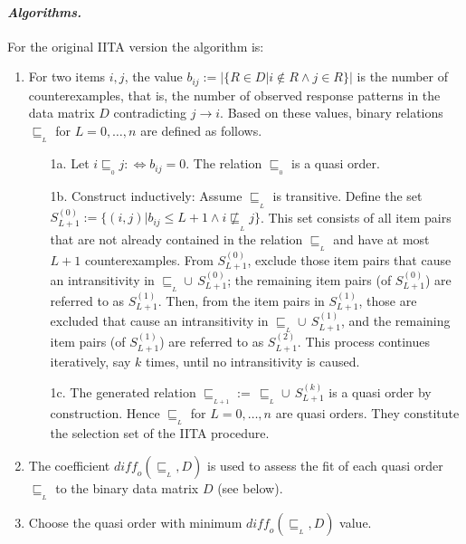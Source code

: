 \documentclass[nojss]{jss}
\begin{document}
\paragraph{\it Algorithms.}
For the original IITA version \citep{Schrepp:03} the algorithm is: 
\begin{enumerate}
\item 
For two items $i, j$, the value $b_{ij} := |\{R \in D| i\not\in R \wedge j\in R\}|$ is the number of counterexamples, that is, the number of observed response patterns in the data matrix $D$ contradicting $j \rightarrow i$. Based on these values, binary relations $\sqsubseteq_{_L}$ for 
$L = 0, \ldots, n$ are defined as follows.
\begin{enumerate} 
\item[1a.] 
Let $i \sqsubseteq_{_0} j : \Leftrightarrow b_{ij} = 0$. The relation $\sqsubseteq_{_0}$ is  a quasi order. 
\item[1b.] 
Construct inductively:
Assume $\sqsubseteq_{_L}$ is transitive. Define the set $S_{L+1}^{(0)}:=\{(i,j)| b_{ij} \leq L +1 
\wedge i \not\sqsubseteq_{_L} \!j \}$. 
This set consists of all item pairs that are not already contained in the relation $\sqsubseteq_{_L}$ and have at most $L+1$ counterexamples.
From $S_{L+1}^{(0)}$, exclude those item pairs that cause an intransitivity in 
$\sqsubseteq_{_L} \! \!\cup \,S_{L+1}^{(0)}$;
the remaining item pairs (of ${S}_{L+1}^{(0)}$) are referred to as ${S}_{L+1}^{(1)}$. 
Then, from the item pairs in ${S}_{L+1}^{(1)}$, those are excluded that cause an intransitivity 
in $\sqsubseteq_{_L} \! \!\cup \,{S}_{L+1}^{(1)}$, and the remaining item pairs 
(of ${S}_{L+1}^{(1)}$) are referred to as ${S}_{L+1}^{(2)}$.
This process continues iteratively, say $k$ times, until no intransitivity is caused. 
\item[1c.] 
The generated relation 
$\sqsubseteq_{_{L+1}}:= \, \sqsubseteq_{_L}\!\! \cup \, {S}_{L+1}^{(k)}$ is a quasi order by construction. Hence $\sqsubseteq_{_L}$ for $L=0, \ldots, n$ are quasi orders. 
They constitute the selection set of the IITA procedure.
\end{enumerate}
\item 
The coefficient $\mathit{diff_o}(\sqsubseteq_{_L}, D)$ is used to assess the fit of each quasi order 
$\sqsubseteq_{_L}$ to the binary data matrix $D$ (see below).
\item 
Choose the quasi order with minimum $\mathit{diff_o}(\sqsubseteq_{_L}, D)$ value.
\end{enumerate}
\end{document}
